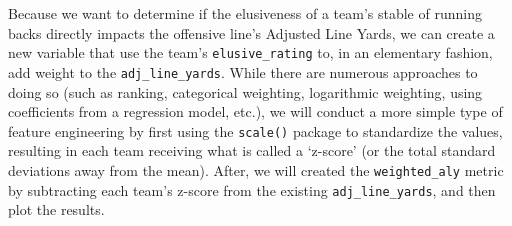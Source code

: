 \documentclass[
  letterpaper,
]{krantz}
\begin{document}
Because we want to determine if the elusiveness of a team's stable of
running backs directly impacts the offensive line's Adjusted Line Yards,
we can create a new variable that use the team's
\texttt{elusive\_rating} to, in an elementary fashion, add weight to the
\texttt{adj\_line\_yards}. While there are numerous approaches to doing
so (such as ranking, categorical weighting, logarithmic weighting, using
coefficients from a regression model, etc.), we will conduct a more
simple type of feature engineering by first using the \texttt{scale()}
package to standardize the values, resulting in each team receiving what
is called a `z-score' (or the total standard deviations away from the
mean). After, we will created the \texttt{weighted\_aly} metric by
subtracting each team's z-score from the existing
\texttt{adj\_line\_yards}, and then plot the results.
\end{document}
